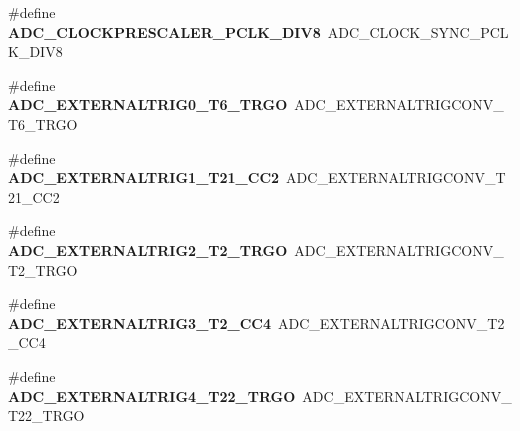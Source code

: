 \begin{DoxyCompactItemize}
\mbox{\label{group___h_a_l___a_d_c___aliased___defines_ga93ccda8f421de00a2aa5b0b19b665393}} 
\#define {\bfseries A\+D\+C\+\_\+\+C\+L\+O\+C\+K\+P\+R\+E\+S\+C\+A\+L\+E\+R\+\_\+\+P\+C\+L\+K\+\_\+\+D\+I\+V8}~A\+D\+C\+\_\+\+C\+L\+O\+C\+K\+\_\+\+S\+Y\+N\+C\+\_\+\+P\+C\+L\+K\+\_\+\+D\+I\+V8
\item 
\mbox{\label{group___h_a_l___a_d_c___aliased___defines_ga72d7fcd1d65274786de2b3ccd6b853c4}} 
\#define {\bfseries A\+D\+C\+\_\+\+E\+X\+T\+E\+R\+N\+A\+L\+T\+R\+I\+G0\+\_\+\+T6\+\_\+\+T\+R\+GO}~A\+D\+C\+\_\+\+E\+X\+T\+E\+R\+N\+A\+L\+T\+R\+I\+G\+C\+O\+N\+V\+\_\+\+T6\+\_\+\+T\+R\+GO
\item 
\mbox{\label{group___h_a_l___a_d_c___aliased___defines_gab001be8f7abe45ddf92a476a65c6dd50}} 
\#define {\bfseries A\+D\+C\+\_\+\+E\+X\+T\+E\+R\+N\+A\+L\+T\+R\+I\+G1\+\_\+\+T21\+\_\+\+C\+C2}~A\+D\+C\+\_\+\+E\+X\+T\+E\+R\+N\+A\+L\+T\+R\+I\+G\+C\+O\+N\+V\+\_\+\+T21\+\_\+\+C\+C2
\item 
\mbox{\label{group___h_a_l___a_d_c___aliased___defines_gaad24eb6d74f2e4396d59afc4c715a053}} 
\#define {\bfseries A\+D\+C\+\_\+\+E\+X\+T\+E\+R\+N\+A\+L\+T\+R\+I\+G2\+\_\+\+T2\+\_\+\+T\+R\+GO}~A\+D\+C\+\_\+\+E\+X\+T\+E\+R\+N\+A\+L\+T\+R\+I\+G\+C\+O\+N\+V\+\_\+\+T2\+\_\+\+T\+R\+GO
\item 
\mbox{\label{group___h_a_l___a_d_c___aliased___defines_gaa0f8054b3363d13a190ee0d366363575}} 
\#define {\bfseries A\+D\+C\+\_\+\+E\+X\+T\+E\+R\+N\+A\+L\+T\+R\+I\+G3\+\_\+\+T2\+\_\+\+C\+C4}~A\+D\+C\+\_\+\+E\+X\+T\+E\+R\+N\+A\+L\+T\+R\+I\+G\+C\+O\+N\+V\+\_\+\+T2\+\_\+\+C\+C4
\item 
\mbox{\label{group___h_a_l___a_d_c___aliased___defines_ga671cb20b99d24f3c9923ac7777e5f84e}} 
\#define {\bfseries A\+D\+C\+\_\+\+E\+X\+T\+E\+R\+N\+A\+L\+T\+R\+I\+G4\+\_\+\+T22\+\_\+\+T\+R\+GO}~A\+D\+C\+\_\+\+E\+X\+T\+E\+R\+N\+A\+L\+T\+R\+I\+G\+C\+O\+N\+V\+\_\+\+T22\+\_\+\+T\+R\+GO
\item 
\mbox{\label{group___h_a_l___a_d_c___aliased___defines_ga54407c5dc446f7d5425d8ac135bee69e}} 

\end{DoxyCompactItemize}
